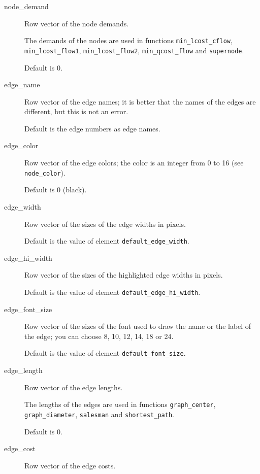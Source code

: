 \documentclass[11pt]{article}
\newcommand{\func}[1]{\texttt{#1}}
\begin{document}
\begin{description}
  \item[node\_demand]

Row vector of the node demands.

The demands of the nodes are used in functions
\func{min\_lcost\_cflow}, 
\func{min\_lcost\_flow1}, \func{min\_lcost\_flow2},
\func{min\_qcost\_flow} and
\func{supernode}.

Default is 0.

  \item[edge\_name]

Row vector of the edge names; it is better that the names of the edges
are different, but this is not an error.

Default is the edge numbers as edge names.

  \item[edge\_color]

Row vector of the edge colors; 
the color is an integer from 0 to 16 (see \texttt{node\_color}).

Default is 0 (black).

  \item[edge\_width]

Row vector of the sizes of the edge widths in pixels.

Default is the value of element \texttt{default\_edge\_width}.

  \item[edge\_hi\_width]

Row vector of the sizes of the highlighted edge widths in pixels.

Default is the value of element \texttt{default\_edge\_hi\_width}.

  \item[edge\_font\_size]

Row vector of the sizes of the font used to draw the name or the label of
the edge; you 
can choose 8, 10, 12, 14, 18 or 24.

Default is the value of element \texttt{default\_font\_size}.

  \item[edge\_length]

Row vector of the edge lengths.

The lengths of the edges are used in functions \func{graph\_center}, 
\func{graph\_diameter},
\func{salesman} and \func{shortest\_path}.

Default is 0.

  \item[edge\_cost]

Row vector of the edge costs.


\end{description}
\end{document}
